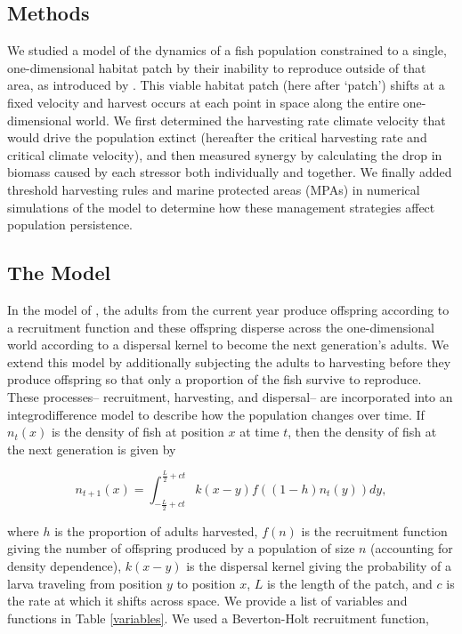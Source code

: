 \documentclass[12pt,english]{article}
\begin{document}
\begin{spacing}{1.9}
\begin{flushleft}
\section{Methods}

We studied a model of the dynamics of a fish population constrained to a single, one-dimensional habitat patch by their inability to reproduce outside of that area, as introduced by \cite{ZhouKot2011}. This viable habitat patch (here after `patch') shifts at a fixed velocity and harvest occurs at each point in space along the entire one-dimensional world.  We first determined the harvesting rate climate velocity that would drive the population extinct (hereafter the critical harvesting rate and critical climate velocity), and then measured synergy by calculating the drop in biomass caused by each stressor both individually and together. We finally added threshold harvesting rules and marine protected areas (MPAs) in numerical simulations of the model to determine how these management strategies affect population persistence.

\subsection{The Model }

In the model of \cite{ZhouKot2011}, the adults from the current year produce offspring according to a recruitment function and these offspring disperse across the one-dimensional world according to a dispersal kernel to become the next generation's adults.  We extend this model by additionally subjecting the adults to harvesting before they produce offspring so that only a proportion of the fish survive to reproduce. These processes-- recruitment, harvesting, and dispersal-- are incorporated into an integrodifference model to describe how the population changes over time. If $n_t(x)$ 
is the density of fish at position $x$ at time $t$, then the density of fish at the next generation is given by

\begin{equation*}
n_{t+1}(x)=\int^{\frac{L}{2}+ct}_{-\frac{L}{2}+ct}k(x-y)f((1-h)n_t(y))dy \label{integrodifference},
\end{equation*}

\noindent where $h$ is the proportion of adults harvested, $f(n)$ is the recruitment function giving the number of 
offspring produced by a population of size $n$ (accounting for density dependence), $k(x-y)$ is the dispersal kernel giving the probability of a  larva traveling from position $y$ to position $x$, $L$ is the length of the patch, and $c$ is the rate at which it  shifts across space.  We provide a list of variables and functions in Table \ref{variables}.  We used a Beverton-Holt recruitment function,


\end{flushleft}
\end{spacing}
\end{document}
